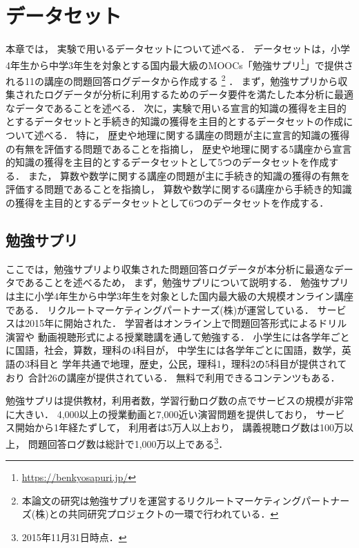 \chapter{データセット}
\label{chap:dataset}
\fancyhf{}
\rhead{\thepage}
\cfoot{\thepage}


本章では，
実験で用いるデータセットについて述べる．
データセットは，小学4年生から中学3年生を対象とする国内最大級のMOOCs「勉強サプリ\footnote{\url{https://benkyosapuri.jp/}}」で提供される11の講座の問題回答ログデータから作成する
\footnote{本論文の研究は勉強サプリを運営するリクルートマーケティングパートナーズ(株)との共同研究プロジェクトの一環で行われている．}
．
まず，勉強サプリから収集されたログデータが分析に利用するためのデータ要件を満たした本分析に最適なデータであることを述べる．
次に，実験で用いる宣言的知識の獲得を主目的とするデータセットと手続き的知識の獲得を主目的とするデータセットの作成について述べる．
特に，
歴史や地理に関する講座の問題が主に宣言的知識の獲得の有無を評価する問題であることを指摘し，
歴史や地理に関する5講座から宣言的知識の獲得を主目的とするデータセットとして5つのデータセットを作成する．
また，
算数や数学に関する講座の問題が主に手続き的知識の獲得の有無を評価する問題であることを指摘し，
算数や数学に関する6講座から手続き的知識の獲得を主目的とするデータセットとして6つのデータセットを作成する．






\section{勉強サプリ}
ここでは，勉強サプリより収集された問題回答ログデータが本分析に最適なデータであることを述べるため，
まず，勉強サプリについて説明する．
勉強サプリは主に小学4年生から中学3年生を対象とした国内最大級の大規模オンライン講座である．
リクルートマーケティングパートナーズ(株)が運営している．
サービスは2015年に開始された．
学習者はオンライン上で問題回答形式によるドリル演習や
動画視聴形式による授業聴講を通して勉強する．
小学生には各学年ごとに国語，社会，算数，理科の4科目が，
中学生には各学年ごとに国語，数学，英語の3科目と 
学年共通で地理，歴史，公民，理科1，理科2の5科目が提供されており
合計26の講座が提供されている．
無料で利用できるコンテンツもある．



勉強サプリは提供教材，利用者数，学習行動ログ数の点でサービスの規模が非常に大きい．
4,000以上の授業動画と7,000近い演習問題を提供しており，
サービス開始から1年経たずして，
利用者は5万人以上おり，
講義視聴ログ数は100万以上，
問題回答ログ数は総計で1,000万以上である\footnote{2015年11月31日時点．}．


